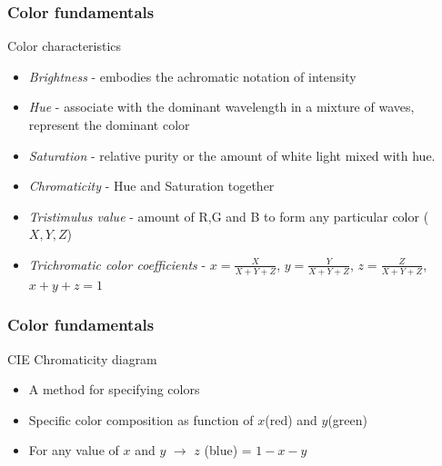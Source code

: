 \documentclass{beamer}
\begin{document}
\begin{frame}
\frametitle{Color fundamentals}
\begin{block}{Color characteristics}
\footnotesize{
\begin{itemize}
\item \textit{Brightness} - embodies the achromatic notation of intensity
\item \textit{Hue} - associate with the dominant wavelength in a mixture of waves, represent the dominant color
\item \textit{Saturation} - relative purity or the amount of white light mixed with hue. 


\item \textit{Chromaticity} -  Hue and Saturation together
\item \textit{Tristimulus value} - amount of R,G and B to form any particular color ($X,Y,Z$)
\item \textit{Trichromatic color coefficients} - $x = \frac{X}{X+Y+Z}$, $y = \frac{Y}{X+Y+Z}$, $z= \frac{Z}{X+Y+Z}$, $x+y+z =1$
\end{itemize}
}
\end{block}
\end{frame}
\begin{frame}
\frametitle{Color fundamentals}
\begin{block}{CIE Chromaticity diagram}
\begin{itemize}
\item A method for specifying colors
\item Specific color composition as function of $x$(red) and $y$(green)
\item For any value of $x$ and $y$ $\rightarrow$ $z$ (blue) = $1 -x-y$
\end{itemize}
\end{block}
\end{frame}
\end{document}
